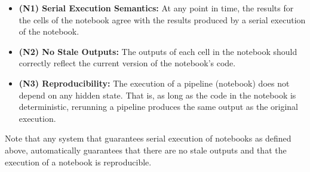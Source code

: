 \begin{itemize}
\item \textbf{(N1) Serial Execution Semantics:} At any point in time, the results for the cells of the notebook agree with the results produced by a serial execution of the notebook.
\item \textbf{(N2) No Stale Outputs:} The outputs of each cell in the notebook should correctly reflect the current version of the notebook's code.
\item \textbf{(N3) Reproducibility:} The execution of a pipeline (notebook) does not depend on any hidden state. That is, as long as the code in the notebook is deterministic, rerunning a pipeline produces the same output as the original execution.
\end{itemize}

Note that any system that guarantees serial execution of notebooks as defined above, automatically guarantees that there are no stale outputs and that the execution of a notebook is reproducible.


